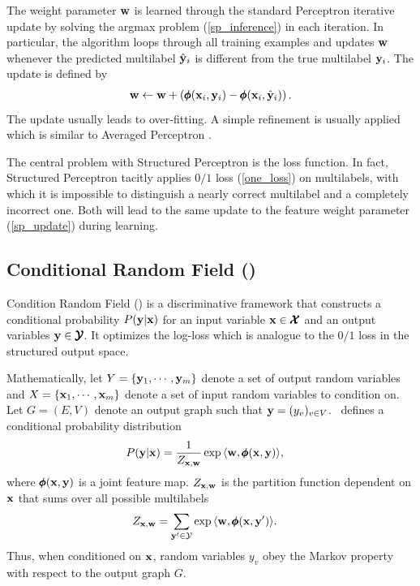 {The weight parameter $\mathbf {w}$ is learned through the standard Perceptron iterative update by solving the argmax problem (\ref{sp_inference}) in each iteration.
In particular, the algorithm loops through all training examples and updates $\mathbf {w}$ whenever the predicted multilabel $\hat{\mathbf {y}}_i$ is different from the true multilabel $\mathbf {y}_i$.
The update is defined by
\begin{align}
	\mathbf {w} \leftarrow \mathbf {w} + \left(\pmb \phi(\mathbf {x}_i,\mathbf {y}_i) - \pmb \phi(\mathbf {x}_i,\hat{\mathbf {y}}_i)\right). \label{sp_update}
\end{align}
The update usually leads to over-fitting.
A simple refinement is usually applied which is similar to Averaged Perceptron \citep{Freund99large}.

The central problem with Structured Perceptron is the loss function.
In fact, Structured Perceptron tacitly applies $0/1$ loss (\ref{one_loss}) on multilabels, with which it is impossible to distinguish a nearly correct multilabel and a completely incorrect one.
Both will lead to the same update to the feature weight parameter (\ref{sp_update}) during learning.


%
% 
\subsection{Conditional Random Field (\crf)} \label{sc_crf}

Condition Random Field (\crf) \citep{lafferty01,taskar02} is a discriminative framework that constructs a conditional probability $P(\mathbf {y}|\mathbf {x})$ for an input variable $\mathbf {x}\in\pmb {\mathcal{X}}$ and an output variables $\mathbf {y}\in\pmb {\mathcal{Y}}$.
It optimizes the log-loss which is analogue to the $0/1$ loss in the structured output space.

Mathematically, let $Y=\{\mathbf {y}_1,\cdots,\mathbf {y}_m\}$ denote a set of output random variables and $X=\{\mathbf {x}_1,\cdots,\mathbf {x}_m\}$ denote a set of input random variables to condition on.
Let $G=(E,V)$ denote an output graph such that $\mathbf {y} = (y_v)_{v\in V}$.
\crf\ defines a conditional probability distribution
\begin{align*}
	P(\mathbf {y}|\mathbf {x}) &= \frac{1}{Z_{\mathbf {x},\mathbf {w}}}\exp{\langle \mathbf {w}, \pmb \phi(\mathbf {x},\mathbf {y}) \rangle},
\end{align*}
where $\pmb \phi(\mathbf {x},\mathbf {y})$ is a joint feature map. 
$Z_{\mathbf {x},\mathbf {w}}$ is the partition function dependent on $\mathbf {x}$ that sums over all possible multilabels 
\begin{align}
	Z_{\mathbf {x},\mathbf {w}} &= \sum_{\mathbf {y}'\in\mathcal{Y}}\exp{\langle \mathbf {w}, \pmb \phi(\mathbf {x},\mathbf {y}') \rangle}. \label{crf_partition_function}
\end{align}
Thus, when conditioned on $\mathbf {x}$, random variables $y_v$ obey the Markov property with respect to the output graph $G$.

}
